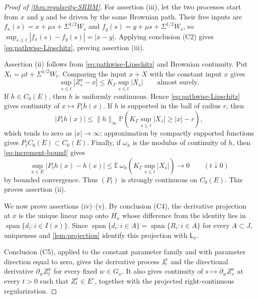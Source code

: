 \documentclass[aihp]{imsart}
\numberwithin{equation}{section}
\theoremstyle{plain}
\theoremstyle{definition}
\newcommand{\1}{\mathbf 1}
\newcommand{\abs}[1]{\left\lvert #1\right\rvert}
\begin{document}
\begin{proof}[Proof of \cref{thm:regularity-SRBM}]
For assertion \textup{(iii)}, let the two processes start from $x$ and $y$ and
be driven by the same Brownian path.  Their free inputs are
$f_x(s)=x+\mu s+\Sigma^{1/2}W_s$ and
$f_y(s)=y+\mu s+\Sigma^{1/2}W_s$, so
$\sup_{s\le t}|f_x(s)-f_y(s)|=|x-y|$.  Applying conclusion \textup{(C2)} gives
\eqref{eq:pathwise-Lipschitz}, proving assertion \textup{(iii)}.

Assertion \textup{(ii)} follows from \eqref{eq:pathwise-Lipschitz} and Brownian
continuity.  Put $X_t=\mu t+\Sigma^{1/2}W_t$.  Comparing the input $x+X$ with
the constant input $x$ gives
\begin{equation}\label{eq:increment-bound}
        \sup_{s\le t}\abs{Z_s^x-x}
        \le
        K_\Gamma\sup_{s\le t}\abs{X_s}
        \qquad\text{almost surely.}
\end{equation}
If $h\in C_0(E)$, then $h$ is uniformly continuous.  Hence
\eqref{eq:pathwise-Lipschitz} gives continuity of $x\mapsto P_th(x)$.  If $h$ is
supported in the ball of radius $r$, then
\[
        |P_th(x)|
        \le
        \|h\|_\infty
        \mathbb P\!\left(
             K_\Gamma\sup_{s\le t}|X_s|\ge |x|-r
        \right),
\]
which tends to zero as $|x|\to\infty$; approximation by compactly supported
functions gives $P_tC_0(E)\subset C_0(E)$.  Finally, if $\omega_h$ is the modulus
of continuity of $h$, then \eqref{eq:increment-bound} gives
\[
        \sup_{x\in E}|P_th(x)-h(x)|
        \le
        \mathbb E\,
        \omega_h\!\left(K_\Gamma\sup_{s\le t}|X_s|\right)
        \longrightarrow0
        \qquad (t\downarrow0)
\]
by bounded convergence.  Thus $(P_t)$ is strongly continuous on $C_0(E)$.  This
proves assertion \textup{(ii)}.

We now prove assertions \textup{(iv)}--\textup{(v)}.  By conclusion
\textup{(C4)}, the derivative projection at $x$ is the unique linear map onto
$H_x$ whose difference from the identity lies in
$\operatorname{span}\{d_i:i\in I(x)\}$.  Since
$\operatorname{span}\{d_i:i\in A\}=\operatorname{span}\{R_i:i\in A\}$ for every
$A\subset J$, uniqueness and \cref{lem:projection} identify this projection with
$\mathsf L_x$.

Conclusion \textup{(C5)}, applied to the constant parameter family and with
parameter direction equal to zero, gives the derivative process $\mathsf J_t^x$
and the directional derivative $\partial_w Z_t^x$ for every fixed $w\in G_x$.
It also gives continuity of $s\mapsto\partial_wZ_s^x$ at every $t>0$ such that
$Z_t^x\in E^\circ$, together with the projected right-continuous
regularization.


\end{proof}
\end{document}
